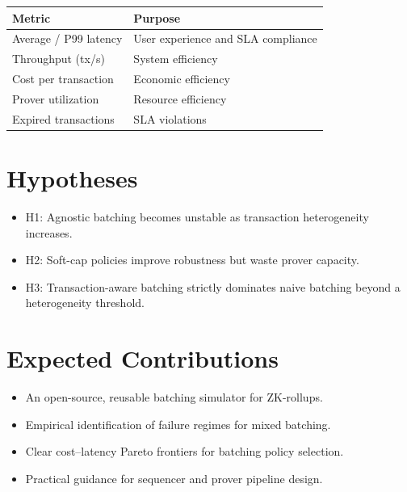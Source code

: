 \documentclass[11pt]{article}
\begin{document}
\begin{center}
\begin{tabular}{ll}
\toprule
\textbf{Metric} & \textbf{Purpose} \\
\midrule
Average / P99 latency & User experience and SLA compliance \\
Throughput (tx/s) & System efficiency \\
Cost per transaction & Economic efficiency \\
Prover utilization & Resource efficiency \\
Expired transactions & SLA violations \\
\bottomrule
\end{tabular}
\end{center}

\section{Hypotheses}

\begin{itemize}[leftmargin=1.5em]
    \item H1: Agnostic batching becomes unstable as transaction heterogeneity increases.
    \item H2: Soft-cap policies improve robustness but waste prover capacity.
    \item H3: Transaction-aware batching strictly dominates naive batching beyond a heterogeneity threshold.
\end{itemize}

\section{Expected Contributions}

\begin{itemize}[leftmargin=1.5em]
    \item An open-source, reusable batching simulator for ZK-rollups.
    \item Empirical identification of failure regimes for mixed batching.
    \item Clear cost–latency Pareto frontiers for batching policy selection.
    \item Practical guidance for sequencer and prover pipeline design.
\end{itemize}
\end{document}
